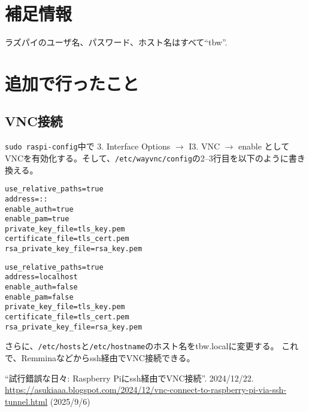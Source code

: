 \documentclass{ltjsarticle}
\begin{document}
\section{補足情報}
ラズパイのユーザ名、パスワード、ホスト名はすべて``tbw''.
\section{追加で行ったこと}
\subsection{VNC接続}
\verb|sudo raspi-config|中で
3. Interface Options $\to$ I3. VNC $\to$ enable
としてVNCを有効化する。そして、\verb|/etc/wayvnc/config|の2--3行目を以下のように書き換える。

\begin{lstlisting}[caption={/etc/wayvnc/config （変更前）}]
use_relative_paths=true
address=::
enable_auth=true
enable_pam=true
private_key_file=tls_key.pem
certificate_file=tls_cert.pem
rsa_private_key_file=rsa_key.pem
\end{lstlisting}
\begin{lstlisting}[caption={/etc/wayvnc/config （変更後）}]
use_relative_paths=true
address=localhost
enable_auth=false
enable_pam=false
private_key_file=tls_key.pem
certificate_file=tls_cert.pem
rsa_private_key_file=rsa_key.pem
\end{lstlisting}
さらに、\verb|/etc/hosts|と\verb|/etc/hostname|のホスト名をtbw.localに変更する。
これで、Remminaなどからssh経由でVNC接続できる\cite{sshVNC}。


\begin{thebibliography}{9}
  ``試行錯誤な日々: Raspberry Piにssh経由でVNC接続''. 2024/12/22. \url{https://asukiaaa.blogspot.com/2024/12/vnc-connect-to-raspberry-pi-via-ssh-tunnel.html} (2025/9/6)
\end{thebibliography}
\end{document}
